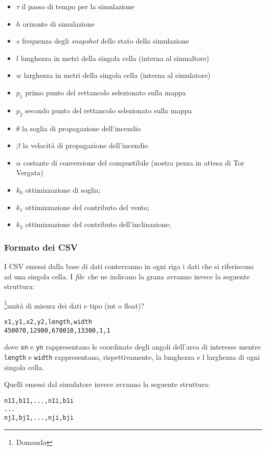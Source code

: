 \documentclass[draft]{article}
\newcommand{\file}{\textit{file}}
\begin{document}
\begin{itemize}
\item $\tau$ il passo di tempo per la simulazione
\item $h$ orizonte di simulazione
\item $s$ frequenza degli \textit{snapshot} dello stato della simulazione
\item $l$ lunghezza in metri della singola cella (interna al simualtore)
\item $w$ larghezza in metri della singola cella (interna al simulatore)
\item $p_1$ primo punto del rettancolo selezionato sulla mappa
\item $p_2$ secondo punto del rettancolo selezionato sulla mappa
\item $\theta$ la soglia di propagazione dell'incendio
\item $\beta$ la velocità di propagazione dell'incendio
\item $\alpha$ costante di conversione del compustibile (nostra pezza in attesa
di Tor Vergata)
\item $k_0$ ottimizzazione di soglia;
\item $k_1$ ottimizzazione del contributo del vento;
\item $k_2$ ottimizzazione del contributo dell'inclinazione;
\end{itemize}

\subsubsection{Formato dei CSV}

I CSV emessi dalla base di dati conterranno in ogni riga i dati che si
riferiscono ad una singola cella. I \file\ che ne indicano la grana avranno
invece la seguente struttura:

\footnote{Domanda}{unità di misura dei dati e tipo (int o float)?}
\begin{verbatim}
x1,y1,x2,y2,length,width
450070,12980,670010,13300,1,1
\end{verbatim}

dove \texttt{xn} e \texttt{yn} rappresentano le coordinate degli angoli
dell'area di interesse mentre \texttt{length} e \texttt{width} rappresentano,
rispettivamente, la lunghezza e l larghezza di ogni singola cella.

Quelli emessi dal simulatore invece avranno la seguente struttura:

\begin{verbatim}
n11,b11,...,n1i,b1i
...
nj1,bj1,...,nji,bji
\end{verbatim}
\end{document}
